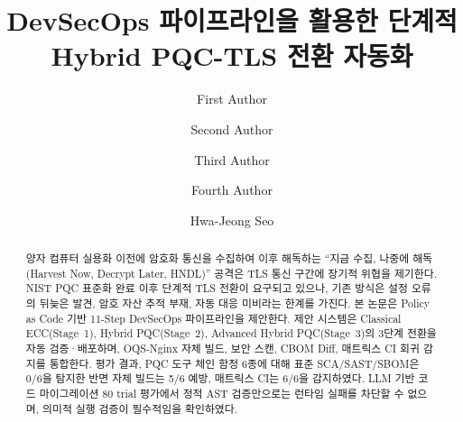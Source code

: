 \title{DevSecOps 파이프라인을 활용한 단계적 Hybrid PQC-TLS 전환 자동화}

\author{
First Author \and
Second Author \and
Third Author \and
Fourth Author \and
Hwa-Jeong Seo
}
%
%
%
\maketitle
\begin{abstract}
양자 컴퓨터 실용화 이전에 암호화 통신을 수집하여 이후 해독하는 ``지금 수집, 나중에 해독(Harvest Now, Decrypt Later, HNDL)'' 공격은 TLS 통신 구간에 장기적 위협을 제기한다.
NIST PQC 표준화 완료 이후 단계적 TLS 전환이 요구되고 있으나, 기존 방식은 설정 오류의 뒤늦은 발견, 암호 자산 추적 부재, 자동 대응 미비라는 한계를 가진다.
본 논문은 Policy as Code 기반 11-Step DevSecOps 파이프라인을 제안한다.
제안 시스템은 Classical ECC(Stage~1), Hybrid PQC(Stage~2), Advanced Hybrid PQC(Stage~3)의 3단계 전환을 자동 검증·배포하며, OQS-Nginx 자체 빌드, 보안 스캔, CBOM Diff, 매트릭스 CI 회귀 감지를 통합한다.
평가 결과, PQC 도구 체인 함정 6종에 대해 표준 SCA/SAST/SBOM은 0/6을 탐지한 반면 자체 빌드는 5/6 예방, 매트릭스 CI는 6/6을 감지하였다.
LLM 기반 코드 마이그레이션 80 trial 평가에서 정적 AST 검증만으로는 런타임 실패를 차단할 수 없으며, 의미적 실행 검증이 필수적임을 확인하였다.


\end{abstract}